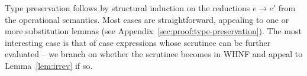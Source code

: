 \documentclass[acmsmall,review,anonymous]{acmart}
\begin{document}

\TypePreservationTheorem
%
\ProgressTheorem
%
Type preservation
follows by structural induction on the reductions $e \longrightarrow
e'$ from the operational semantics. Most cases are straightforward, appealing to one or more
substitution lemmas (see Appendix~\ref{sec:proof:type-preservation}). The most
interesting case is that of case expressions whose scrutinee can be further
evaluated -- we branch on whether the scrutinee becomes in WHNF and appeal to Lemma~\ref{lem:irrev} if so.
%
%
%
%






\end{document}
